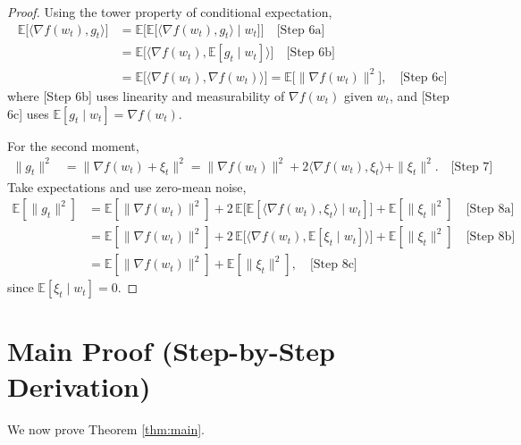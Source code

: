 \documentclass[11pt]{article}
\newcommand{\E}{\mathbb{E}}
\begin{document}
\begin{proof}
Using the tower property of conditional expectation,
\begin{align*}
\E\big[\langle \nabla f(w_t), g_t\rangle\big]
&= \E\Big[\E\big[\langle \nabla f(w_t), g_t\rangle \mid w_t\big]\Big] \quad \text{[Step 6a]}\\
&= \E\Big[\langle \nabla f(w_t), \E[g_t\mid w_t]\rangle\Big] \quad \text{[Step 6b]}\\
&= \E\big[\langle \nabla f(w_t), \nabla f(w_t)\rangle\big] = \E\big[\|\nabla f(w_t)\|^2\big], \quad \text{[Step 6c]}
\end{align*}
where [Step 6b] uses linearity and measurability of $\nabla f(w_t)$ given $w_t$, and [Step 6c] uses $\E[g_t\mid w_t]=\nabla f(w_t)$.

For the second moment,
\begin{align*}
\|g_t\|^2 &= \|\nabla f(w_t)+\xi_t\|^2
= \|\nabla f(w_t)\|^2 + 2\langle \nabla f(w_t), \xi_t\rangle + \|\xi_t\|^2. \quad \text{[Step 7]}
\end{align*}
Take expectations and use zero-mean noise,
\begin{align*}
\E[\|g_t\|^2]
&= \E[\|\nabla f(w_t)\|^2] + 2\,\E\big[\E[\langle \nabla f(w_t), \xi_t\rangle \mid w_t]\big] + \E[\|\xi_t\|^2] \quad \text{[Step 8a]}\\
&= \E[\|\nabla f(w_t)\|^2] + 2\,\E\big[\langle \nabla f(w_t), \E[\xi_t\mid w_t]\rangle\big] + \E[\|\xi_t\|^2] \quad \text{[Step 8b]}\\
&= \E[\|\nabla f(w_t)\|^2] + \E[\|\xi_t\|^2], \quad \text{[Step 8c]}
\end{align*}
since $\E[\xi_t\mid w_t]=0$.
\end{proof}

\section*{Main Proof (Step-by-Step Derivation)}
We now prove Theorem \ref{thm:main}.
\end{document}
